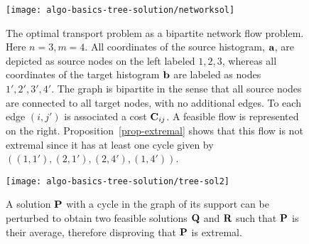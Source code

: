 \begin{figure}[h!]
\centering
\texttt{[image: algo-basics-tree-solution/networksol]}
\caption{\label{fig-simplex}
The optimal transport problem as a bipartite network flow problem. Here $n=3,m=4$. All coordinates of the source histogram, $\a$, are depicted as source nodes on the left labeled $1,2,3$, whereas all coordinates of the target histogram $\b$ are labeled as nodes $1',2',3',4'$. The graph is bipartite in the sense that all source nodes are connected to all target nodes, with no additional edges. To each edge $(i,j')$ is associated a cost $\C_{ij}$. A feasible flow is represented on the right. Proposition~\ref{prop-extremal} shows that this flow is not extremal since it has at least one cycle given by $((1,1'),(2,1'),(2,4'),(1,4'))$. 
}
\end{figure}


\begin{figure}[h!]
\centering
\texttt{[image: algo-basics-tree-solution/tree-sol2]}
\caption{\label{fig-perturb}
A solution $\P$ with a cycle in the graph of its support can be perturbed to obtain two feasible solutions $\Q$ and $\RRd$ such that $\P$ is their average, therefore disproving that $\P$ is extremal. 
}
\end{figure}

